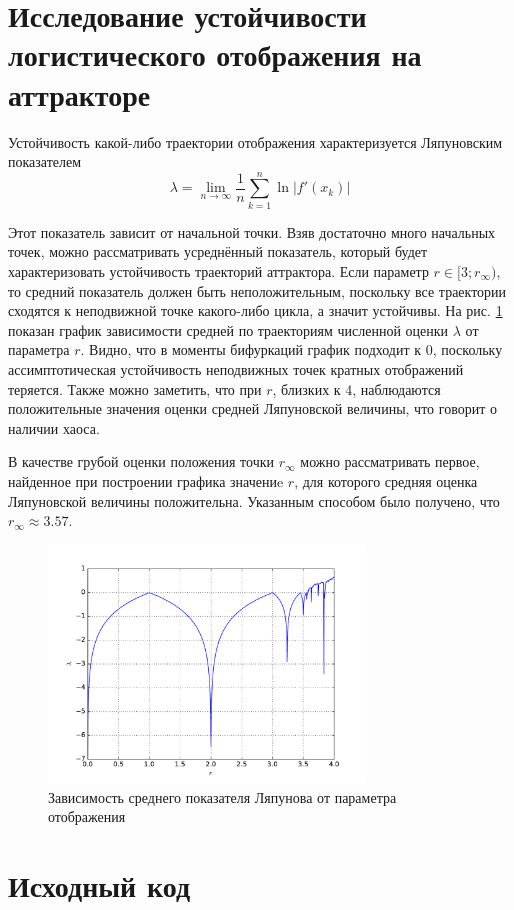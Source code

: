 \documentclass[a4paper]{article}
\begin{document}
\section{Исследование устойчивости логистического отображения на аттракторе}

Устойчивость какой-либо траектории отображения характеризуется Ляпуновским показателем
\begin{displaymath}
\lambda = \lim_{n \to \infty} \frac{1}{n}\sum_{k=1}^{n}\ln|f'(x_k)|
\end{displaymath}

Этот показатель зависит от начальной точки. Взяв достаточно много начальных точек,
можно рассматривать усреднённый показатель, который будет характеризовать устойчивость
траекторий аттрактора. Если параметр \(r\in [3;r_\infty)\), то средний показатель
должен быть неположительным, поскольку все траектории сходятся к неподвижной точке
какого-либо цикла, а значит устойчивы. На рис. \ref{fig:lyapunov_characteristic}
показан график зависимости средней по траекториям численной оценки \(\lambda\) от параметра \(r\).
Видно, что в моменты бифуркаций график подходит к \(0\), поскольку ассимптотическая
устойчивость неподвижных точек кратных отображений теряется. Также можно заметить, что
при \(r\), близких к \(4\), наблюдаются положительные значения оценки средней Ляпуновской величины,
что говорит о наличии хаоса.

В качестве грубой оценки положения точки \(r_\infty\) можно рассматривать первое, найденное
при построении графика значениe \(r\), для которого средняя оценка Ляпуновской величины положительна.
Указанным способом было получено, что \(r_\infty \approx 3.57\).

\begin{figure}[H]
	\center
	\includegraphics[width=0.75\textwidth]{../pictures/lab6_lyapunov_characteristic.pdf}
	\caption{Зависимость среднего показателя Ляпунова от параметра отображения}
	\label{fig:lyapunov_characteristic}
\end{figure}

\section{Исходный код}

\end{document}
